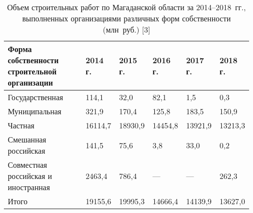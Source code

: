 \begin{table}[h!]
\caption{Объем строительных работ по Магаданской области за 2014--2018~гг., выполненных организациями различных форм собственности (млн~руб.) [3]}
\label{tab:serebryakova-tab-1}
\begin{changemargin}{-0.5cm}{-1cm}
\begin{tabular}{llllll}
\toprule
Форма 			собственности \newline строительной организации & 2014 			г. & 2015 			г. & 2016 			г. & 2017 			г. & 2018 			г. \\
\midrule
Государственная                                 & 114,1      & 32,0       & 82,1       & 1,5        & 0,3        \\
Муниципальная                                   & 321,9      & 170,4      & 125,8      & 183,5      & 150,9      \\
Частная                                         & 16114,7    & 18930,9    & 14454,8    & 13921,9    & 13213,3    \\
Смешанная 			российская                         & 141,5      & 75,6       & 3,8        & 33,0       & 0,2        \\
Совместная 			российская и иностранная          & 2463,4     & 786,4      & ---          & ---          & 262,3      \\
Итого                                           & 19155,6    & 19995,3    & 14666,4    & 14139,9    & 13627,0 \\
\bottomrule
\end{tabular}
\end{changemargin}
\end{table}
